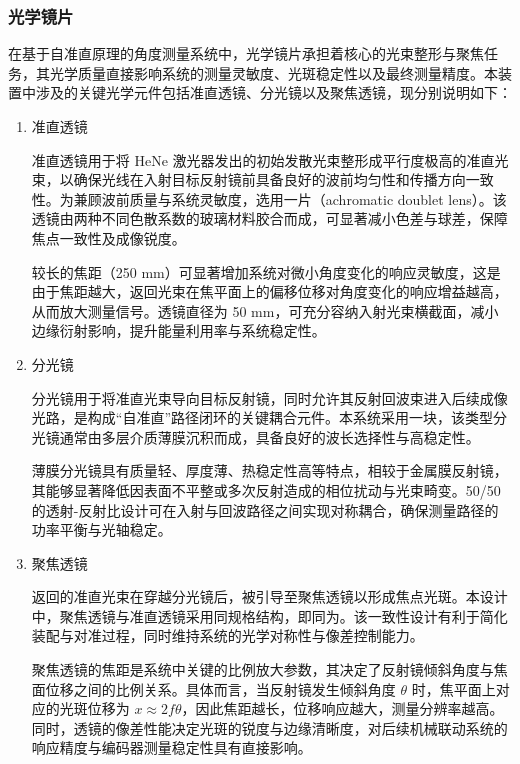 \subsubsection{光学镜片}
在基于自准直原理的角度测量系统中，光学镜片承担着核心的光束整形与聚焦任务，其光学质量直接影响系统的测量灵敏度、光斑稳定性以及最终测量精度。本装置中涉及的关键光学元件包括准直透镜、分光镜以及聚焦透镜，现分别说明如下：
\begin{enumerate}
	\item 准直透镜
	
	准直透镜用于将 HeNe 激光器发出的初始发散光束整形成平行度极高的准直光束，以确保光线在入射目标反射镜前具备良好的波前均匀性和传播方向一致性。为兼顾波前质量与系统灵敏度，选用一片（achromatic doublet lens）。该透镜由两种不同色散系数的玻璃材料胶合而成，可显著减小色差与球差，保障焦点一致性及成像锐度。
	
	较长的焦距（250 mm）可显著增加系统对微小角度变化的响应灵敏度，这是由于焦距越大，返回光束在焦平面上的偏移位移对角度变化的响应增益越高，从而放大测量信号。透镜直径为 50 mm，可充分容纳入射光束横截面，减小边缘衍射影响，提升能量利用率与系统稳定性。
	
	\item 分光镜
	
	分光镜用于将准直光束导向目标反射镜，同时允许其反射回波束进入后续成像光路，是构成“自准直”路径闭环的关键耦合元件。本系统采用一块，该类型分光镜通常由多层介质薄膜沉积而成，具备良好的波长选择性与高稳定性。
	
	薄膜分光镜具有质量轻、厚度薄、热稳定性高等特点，相较于金属膜反射镜，其能够显著降低因表面不平整或多次反射造成的相位扰动与光束畸变。50/50 的透射-反射比设计可在入射与回波路径之间实现对称耦合，确保测量路径的功率平衡与光轴稳定。
	
	\item 聚焦透镜
	
	返回的准直光束在穿越分光镜后，被引导至聚焦透镜以形成焦点光斑。本设计中，聚焦透镜与准直透镜采用同规格结构，即同为。该一致性设计有利于简化装配与对准过程，同时维持系统的光学对称性与像差控制能力。
	
	聚焦透镜的焦距是系统中关键的比例放大参数，其决定了反射镜倾斜角度与焦面位移之间的比例关系。具体而言，当反射镜发生倾斜角度 $\theta$ 时，焦平面上对应的光斑位移为 $x \approx 2f\theta$，因此焦距越长，位移响应越大，测量分辨率越高。同时，透镜的像差性能决定光斑的锐度与边缘清晰度，对后续机械联动系统的响应精度与编码器测量稳定性具有直接影响。
\end{enumerate}

